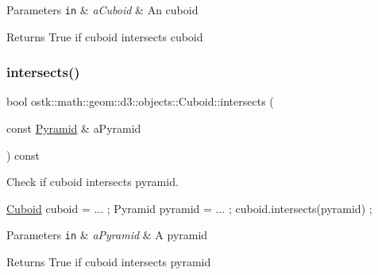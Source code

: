 \begin{DoxyParams}[1]{Parameters}
\mbox{\tt in}  & {\em a\+Cuboid} & An cuboid \\
\hline
\end{DoxyParams}
\begin{DoxyReturn}{Returns}
True if cuboid intersects cuboid 
\end{DoxyReturn}
\mbox{\label{classostk_1_1math_1_1geom_1_1d3_1_1objects_1_1_cuboid_a528e8cfa569be9a65a6f9f1407af4a53}} 
\subsubsection{\texorpdfstring{intersects()}{intersects()}\hspace{0.1cm}{\footnotesize\ttfamily [9/9]}}
{\footnotesize\ttfamily bool ostk\+::math\+::geom\+::d3\+::objects\+::\+Cuboid\+::intersects (\begin{DoxyParamCaption}\item[{const \hyperlink{classostk_1_1math_1_1geom_1_1d3_1_1objects_1_1_pyramid}{Pyramid} \&}]{a\+Pyramid }\end{DoxyParamCaption}) const}



Check if cuboid intersects pyramid. 


\begin{DoxyCode}
\hyperlink{classostk_1_1math_1_1geom_1_1d3_1_1objects_1_1_cuboid_a1da071d7cbb0a694348628f098f77c5b}{Cuboid} cuboid = ... ;
Pyramid pyramid = ... ;
cuboid.intersects(pyramid) ;
\end{DoxyCode}



\begin{DoxyParams}[1]{Parameters}
\mbox{\tt in}  & {\em a\+Pyramid} & A pyramid \\
\hline
\end{DoxyParams}
\begin{DoxyReturn}{Returns}
True if cuboid intersects pyramid 
\end{DoxyReturn}
\mbox{\label{classostk_1_1math_1_1geom_1_1d3_1_1objects_1_1_cuboid_a4e7dbaf957b92cbbb02dd85c0b505366}} 
